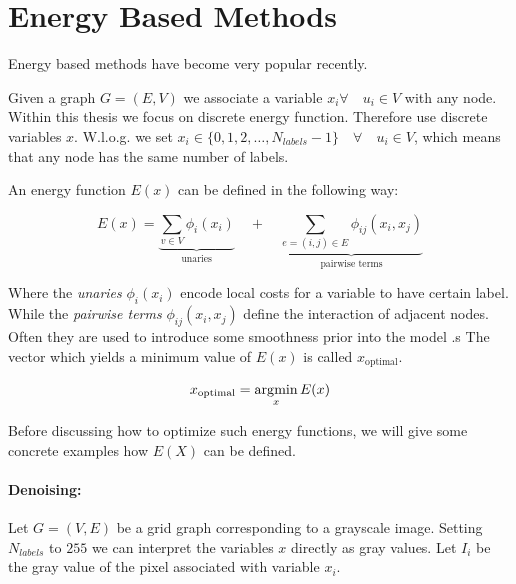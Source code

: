 \section{Energy Based Methods}\label{sec:energy_based_methods}

Energy based methods have become very popular recently.

Given a graph $G = (E,V)$ we 
associate  a variable $ x_i \forall \quad u_i \in V$ with any node.
Within this thesis we focus on discrete energy function.
Therefore use discrete variables $x$.
W.l.o.g. we set  $ x_i   \in \{ 0,1,2,\ldots, N_{labels}-1 \} \quad \forall \quad u_i \in V$,
which means that any node has the same number of labels.

An energy function $E(x)$ can be  defined  in the following way:

\begin{equation} \label{eq:gm_energy}
    E(x) = 
    \underbrace{
        \sum_{v \in V} \phi_i(x_i)
    }_{\text{unaries}}
     \quad +  \quad
    \underbrace{
        \sum_{e=(i,j) \in E } \phi_{ij}(x_i,x_j) 
    }_{\text{pairwise terms}}
\end{equation}



Where the \emph{unaries} $\phi_i(x_i)$ encode local costs
for a variable to have certain label.
While the \emph{pairwise terms} $\phi_{ij}(x_i,x_j) $ define the interaction of adjacent nodes.
Often they are used to introduce some smoothness prior
into the model \citep{szeliski_2008_pami}.s
The vector which yields a minimum value of $E(x)$
is called $x_{\text{optimal}}$.

\begin{equation} \label{eq:gm_argmin}
x_{\text{optimal}} = \operatorname*{\arg\!\min}_{x}  E(x)
\end{equation}


Before discussing how to optimize such energy functions,
we will give some concrete examples how $E(X)$ 
can be defined.



\paragraph{Denoising:}


Let $G=(V,E)$ be a grid graph corresponding to
a grayscale image.
Setting $N_{labels}$ to $255$ we can interpret  the variables $x$ directly as
gray values.
Let $I_i$ be the gray value of the pixel associated with variable $x_i$.

